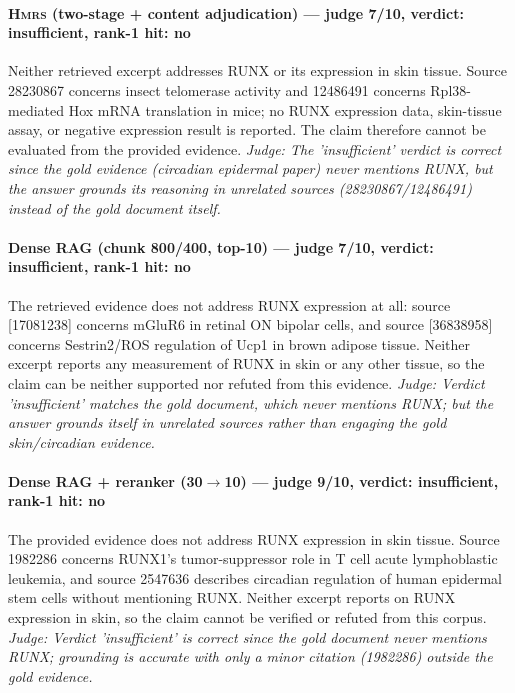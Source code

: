 \documentclass[sigconf, review, anonymous]{acmart}
\begin{document}
\paragraph{\textbf{\textsc{Hmrs}} (two-stage + content adjudication) --- judge 7/10, verdict: insufficient, rank-1 hit: no}
\noindent Neither retrieved excerpt addresses RUNX or its expression in skin tissue. Source 28230867 concerns insect telomerase activity and 12486491 concerns Rpl38-mediated Hox mRNA translation in mice; no RUNX expression data, skin-tissue assay, or negative expression result is reported. The claim therefore cannot be evaluated from the provided evidence.
\noindent\small\textit{Judge: The 'insufficient' verdict is correct since the gold evidence (circadian epidermal paper) never mentions RUNX, but the answer grounds its reasoning in unrelated sources (28230867/12486491) instead of the gold document itself.}
\paragraph{Dense RAG (chunk 800/400, top-10) --- judge 7/10, verdict: insufficient, rank-1 hit: no}
\noindent The retrieved evidence does not address RUNX expression at all: source [17081238] concerns mGluR6 in retinal ON bipolar cells, and source [36838958] concerns Sestrin2/ROS regulation of Ucp1 in brown adipose tissue. Neither excerpt reports any measurement of RUNX in skin or any other tissue, so the claim can be neither supported nor refuted from this evidence.
\noindent\small\textit{Judge: Verdict 'insufficient' matches the gold document, which never mentions RUNX; but the answer grounds itself in unrelated sources rather than engaging the gold skin/circadian evidence.}
\paragraph{Dense RAG + reranker (30$\to$10) --- judge 9/10, verdict: insufficient, rank-1 hit: no}
\noindent The provided evidence does not address RUNX expression in skin tissue. Source 1982286 concerns RUNX1's tumor-suppressor role in T cell acute lymphoblastic leukemia, and source 2547636 describes circadian regulation of human epidermal stem cells without mentioning RUNX. Neither excerpt reports on RUNX expression in skin, so the claim cannot be verified or refuted from this corpus.
\noindent\small\textit{Judge: Verdict 'insufficient' is correct since the gold document never mentions RUNX; grounding is accurate with only a minor citation (1982286) outside the gold evidence.}
\end{document}
